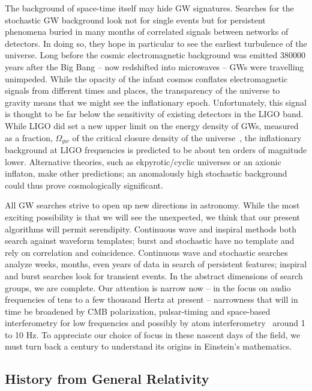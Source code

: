 The background of space-time itself may hide GW signatures. 
Searches for the stochastic GW background look not for single events but for persistent phenomena buried in many months of correlated signals between networks of detectors. 
In doing so, they hope in particular to see the earliest turbulence of the universe.
 Long before the cosmic electromagnetic background was emitted 380000 years after the Big Bang -- now redshifted into microwaves -- GWs were travelling unimpeded. 
While the opacity of the infant cosmos conflates electromagnetic signals from different times and places, the transparency of the universe to gravity means that we might see the inflationary epoch. 
Unfortunately, this signal is thought to be far below the sensitivity of existing detectors in the LIGO band. 
While LIGO did set a new upper limit on the energy density of GWs, measured as a fraction, $\Omega_{gw}$ of the critical closure density of the universe~\cite{LIGOStochasticNature2009}, the inflationary background at LIGO frequencies is predicted to be about ten orders of magnitude lower. 
Alternative theories, such as ekpyrotic/cyclic universes or an axionic inflaton, make other predictions; an anomalously high stochastic background could thus prove cosmologically significant.

All GW searches strive to open up new directions in astronomy. 
While the most exciting possibility is that we will see the unexpected, we think that our present algorithms will permit serendipity. 
Continuous wave and inspiral methods both search against waveform templates; burst and stochastic have no template and rely on correlation and coincidence. 
Continuous wave and stochastic searches analyze weeks, months, even years of data in search of persistent features; inspiral and burst searches look for transient events. 
In the abstract dimensions of search groups, we are complete. 
Our attention is narrow now -- in the focus on audio frequencies of tens to a few thousand Hertz at present -- narrowness that will in time be broadened by CMB polarization, pulsar-timing and space-based interferometry for low frequencies and possibly by atom interferometry~\cite{Dimopoulos2009} around 1 to 10 Hz. 
To appreciate our choice of focus in these nascent days of the field, we must turn back a century to understand its origins in Einstein's mathematics.

        \subsection{History from General Relativity}
        \label{history_GR}

